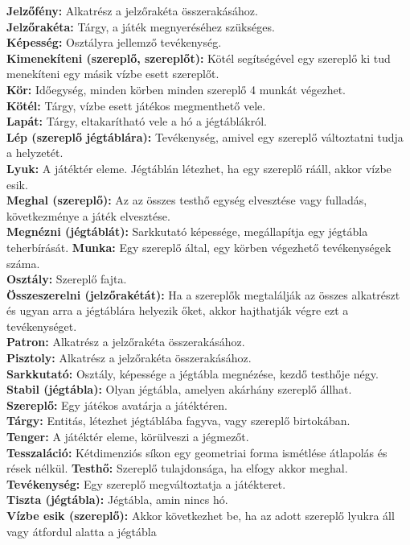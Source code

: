 \textbf{Jelzőfény:} Alkatrész a jelzőrakéta összerakásához. \\
\textbf{Jelzőrakéta:} Tárgy, a játék megnyeréséhez szükséges. \\
\textbf{Képesség:} Osztályra jellemző tevékenység. \\
\textbf{Kimenekíteni (szereplő, szereplőt):} Kötél segítségével egy szereplő ki tud menekíteni egy másik vízbe esett szereplőt. \\
\textbf{Kör:} Időegység, minden körben minden szereplő 4 munkát végezhet. \\
\textbf{Kötél:} Tárgy, vízbe esett játékos megmenthető vele. \\
\textbf{Lapát:} Tárgy, eltakarítható vele a hó a jégtáblákról. \\
\textbf{Lép (szereplő jégtáblára):} Tevékenység, amivel egy szereplő változtatni tudja a helyzetét. \\
\textbf{Lyuk:} A játéktér eleme. Jégtáblán létezhet, ha egy szereplő rááll, akkor vízbe esik. \\
\textbf{Meghal (szereplő):} Az az összes testhő egység elvesztése vagy fulladás, következménye a játék elvesztése. \\
\textbf{Megnézni (jégtáblát):} Sarkkutató képessége, megállapítja egy jégtábla teherbírását.
\textbf{Munka:} Egy szereplő által, egy körben végezhető tevékenységek száma. \\
\textbf{Osztály:} Szereplő fajta. \\
\textbf{Összeszerelni (jelzőrakétát):} Ha a szereplők megtalálják az összes alkatrészt és ugyan arra a jégtáblára helyezik őket, akkor hajthatják végre ezt a tevékenységet. \\
\textbf{Patron:} Alkatrész a jelzőrakéta összerakásához. \\
\textbf{Pisztoly:} Alkatrész  a jelzőrakéta összerakásához.\\
\textbf{Sarkkutató:} Osztály, képessége a jégtábla megnézése, kezdő testhője négy. \\
\textbf{Stabil (jégtábla):} Olyan jégtábla, amelyen akárhány szereplő állhat. \\
\textbf{Szereplő:} Egy játékos avatárja a játéktéren. \\
\textbf{Tárgy:} Entitás, létezhet jégtáblába fagyva, vagy szereplő birtokában. \\
\textbf{Tenger:} A játéktér eleme, körülveszi a jégmezőt. \\
\textbf{Tesszaláció:} Kétdimenziós síkon egy geometriai forma ismétlése átlapolás és rések nélkül.
\textbf{Testhő:} Szereplő tulajdonsága, ha elfogy akkor meghal. \\
\textbf{Tevékenység:} Egy szereplő megváltoztatja a játékteret. \\
\textbf{Tiszta (jégtábla):} Jégtábla, amin nincs hó. \\
\textbf{Vízbe esik (szereplő):} Akkor következhet be, ha az adott szereplő lyukra áll vagy átfordul alatta a jégtábla \\
\newpage


